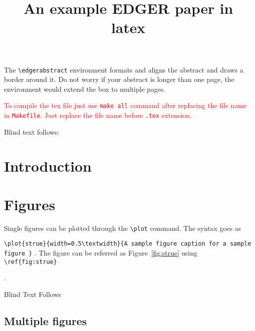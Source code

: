 \documentclass{edger}
\begin{document}
\title{An example EDGER paper in latex
}



\institution{}

\begin{edgerabstract}
The \verb|\edgerabstract| environment formats and aligns the abstract and draws a border around it. Do not worry if your abstract is longer than one page, the environment would extend the box to multiple pages. 

\textcolor{red}{To compile the tex file just use \texttt{make all} command after replacing the file name in \texttt{Makefile}. Just replace the file name before \texttt{.tex} extension.}

Blind text follows: \lipsum[1]
\end{edgerabstract}



\section*{Introduction}

\lipsum[1-7]   


\section*{Figures}

Single figures can be plotted through the \verb|\plot| command. The syntax goes as

 \verb|\plot{strue}{width=0.5\textwidth}{A sample figure caption for a sample figure }| .
 The figure can be referred as Figure~\ref{fig:strue} using \verb|\ref{fig:strue}|

.


Blind Text Follows
\lipsum[1-7]  
\subsection*{Multiple  figures}
\end{document}
